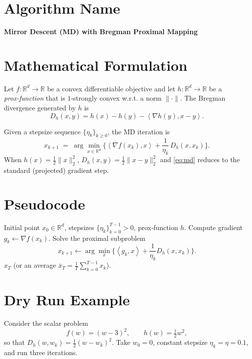 \documentclass[11pt]{article}
\newcommand{\inner}[2]{\left\langle #1,#2\right\rangle}
\newcommand{\Breg}[2]{D_{h}(#1,#2)}
\newcommand{\grad}{\nabla}
\begin{document}
\section*{Algorithm Name}
\textbf{Mirror Descent (MD) with Bregman Proximal Mapping}

\section*{Mathematical Formulation}
Let $f:\mathbb{R}^{d}\rightarrow\mathbb{R}$ be a convex differentiable objective and let $h:\mathbb{R}^{d}\rightarrow\mathbb{R}$ be a \emph{prox‑function} that is $1$‑strongly convex w.r.t. a norm $\|\cdot\|$.
The Bregman divergence generated by $h$ is
\[
\Breg{x}{y}=h(x)-h(y)-\inner{\grad h(y)}{x-y}.
\]

Given a stepsize sequence $\{\eta_k\}_{k\ge 0}$, the MD iteration is
\begin{equation}
\label{eq:md}
x_{k+1}\;=\;\arg\min_{x\in\mathbb{R}^{d}}\Big\{\inner{\grad f(x_k)}{x}
+\frac{1}{\eta_k}\,\Breg{x}{x_k}\Big\}.
\end{equation}
When $h(x)=\tfrac12\|x\|_{2}^{2}$, $\Breg{x}{y}=\tfrac12\|x-y\|_{2}^{2}$ and \eqref{eq:md}
reduces to the standard (projected) gradient step.

\section*{Pseudocode}
\begin{algorithm}[H]
\caption{Mirror Descent}
\begin{algorithmic}[1]
\REQUIRE Initial point $x_{0}\in\mathbb{R}^{d}$, stepsizes $\{\eta_k\}_{k=0}^{T-1}>0$, prox‑function $h$.
    \STATE Compute gradient $g_k \gets \grad f(x_k)$.
    \STATE Solve the proximal subproblem
    \[
    x_{k+1}\gets \arg\min_{x}\Big\{\inner{g_k}{x}+\frac{1}{\eta_k}\Breg{x}{x_k}\Big\}.
    \]
\ENDFOR
\RETURN $x_T$ (or an average $\bar{x}_T=\tfrac1T\sum_{k=0}^{T-1}x_k$).
\end{algorithmic}
\end{algorithm}

\section*{Dry Run Example}
Consider the scalar problem
\[
f(w)=(w-3)^2,\qquad h(w)=\tfrac12 w^{2},
\]
so that $\Breg{w}{w_k}=\tfrac12(w-w_k)^2$.  
Take $w_0=0$, constant stepsize $\eta_k=\eta=0.1$, and run three iterations.
\end{document}
